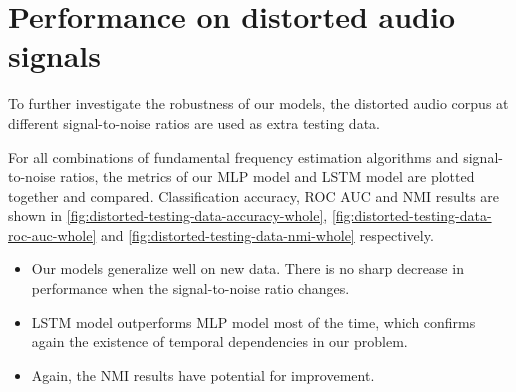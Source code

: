 \documentclass[11pt,a4paper]{report}
\begin{document}
\section{Performance on distorted audio signals}

To further investigate the robustness of our models, the distorted audio corpus at different signal-to-noise ratios are used as extra testing data.

For all combinations of fundamental frequency estimation algorithms and signal-to-noise ratios, the metrics of our MLP model and LSTM model are plotted together and compared.
Classification accuracy, ROC AUC and NMI results are shown in \autoref{fig:distorted-testing-data-accuracy-whole}, \autoref{fig:distorted-testing-data-roc-auc-whole} and \autoref{fig:distorted-testing-data-nmi-whole} respectively.

\begin{itemize}
  \item Our models generalize well on new data.
    There is no sharp decrease in performance when the signal-to-noise ratio changes.
  \item LSTM model outperforms MLP model most of the time, which confirms again the existence of temporal dependencies in our problem.
  \item Again, the NMI results have potential for improvement.
\end{itemize}
\end{document}
